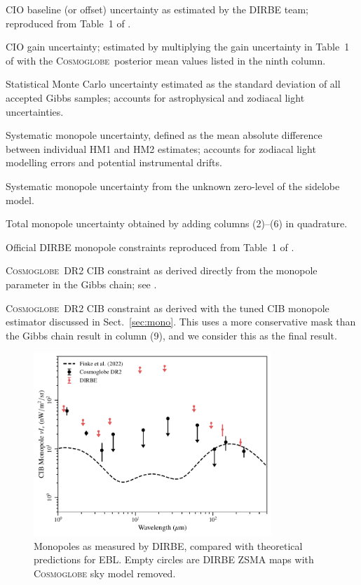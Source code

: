 \documentclass{aa}
\newcommand{\cosmoglobe}{\textsc{Cosmoglobe}}
\begin{document}
\begin{table}
\endPlancktablewide
{} CIO baseline (or offset) uncertainty as estimated by the DIRBE team; reproduced from Table~1 of \citet{hauser:1998}.\par
{} CIO gain uncertainty; estimated by multiplying the gain uncertainty in Table~1 of \citet{hauser:1998} with the \cosmoglobe\ posterior mean values listed in the ninth column.\par
{} Statistical Monte Carlo uncertainty estimated as the standard deviation of all accepted Gibbs samples; accounts for astrophysical and zodiacal light uncertainties.\par
{} Systematic monopole uncertainty, defined as the mean absolute difference between individual HM1 and HM2 estimates; accounts for zodiacal light modelling errors and potential instrumental drifts.\par
{} Systematic monopole uncertainty from the unknown zero-level of the sidelobe model.\par
{} Total monopole uncertainty obtained by adding columns (2)--(6) in quadrature.\par
{} Official DIRBE monopole constraints reproduced from Table~1 of \citet{hauser:1998}.\par
{} \cosmoglobe\ DR2 CIB constraint as derived directly from the monopole parameter in the Gibbs chain; see \citet{CG02_01}.\par
{} \cosmoglobe\ DR2 CIB constraint as derived with the tuned CIB monopole estimator discussed in Sect.~\ref{sec:mono}. This uses a more conservative mask than the Gibbs chain result in column (9), and we consider this as the final result.\par
\par
\end{table}


\begin{figure}
	\centering
	\includegraphics[width=0.8\textwidth]{figs/CIB_mono.pdf}
	\caption{Monopoles as measured by DIRBE, compared with theoretical predictions for EBL. Empty circles are DIRBE ZSMA maps with \textsc{Cosmoglobe} sky model removed.}
	\label{fig: EBL_monopoles}
\end{figure}
\end{document}
